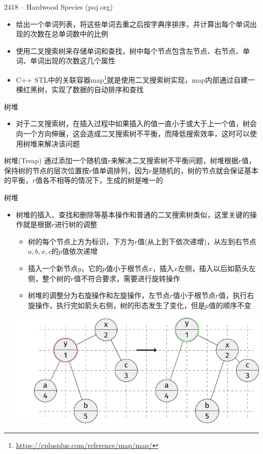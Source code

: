 \begin{frame}{2418 -- Hardwood Species (poj.org)}
    \begin{itemize}
        \item 给出一个单词列表，将这些单词去重之后按字典序排序，并计算出每个单词出现的次数在总单词数中的比例
        \vfill
        \item 使用二叉搜索树来存储单词和查找，树中每个节点包含左节点、右节点、单词、单词出现的次数这几个属性
        \vfill
        \item C++ STL中的关联容器map\footnote{\url{https://cplusplus.com/reference/map/map/}}就是使用二叉搜索树实现，map内部通过自建一棵红黑树，实现了数据的自动排序和查找
    \end{itemize}
\end{frame}
\begin{frame}{树堆}
    \begin{itemize}
        \item  对于二叉搜索树，在插入过程中如果插入的值一直小于或大于上一个值，树会向一个方向伸展，这会造成二叉搜索树不平衡，而降低搜索效率，这时可以使用树堆来解决该问题
    \end{itemize}
    \vfill
    \begin{block}{树堆(Treap)}
        \quad 通过添加一个随机值$r$来解决二叉搜索树不平衡问题，树堆根据$r$值，保持树的节点的层次位置按$r$值单调排列，因为$r$是随机的，树的节点就会保证基本的平衡，$r$值各不相等的情况下，生成的树是唯一的
    \end{block}
\end{frame}
\begin{frame}{树堆}
    \begin{itemize}
        \item 树堆的插入、查找和删除等基本操作和普通的二叉搜索树类似，这里关键的操作就是根据$r$进行树的调整
        \begin{itemize}
            \item 树的每个节点上方为标识，下方为$r$值(从上到下依次递增)，从左到右节点$a,b,x,c$的$p$值依次递增
            \item 插入一个新节点$y$，它的$p$值小于根节点$x$，插入$x$左侧，插入以后如箭头左侧，整个树的$r$值不符合要求，需要进行旋转操作
            \item 树堆的调整分为右旋操作和左旋操作，左节点$r$值小于根节点$r$值，执行右旋操作，执行完如箭头右侧，树的形态发生了变化，但是$p$值的顺序不变
        \end{itemize}
        \includegraphics[scale=.6,center]{fig/6-6.pdf}
    \end{itemize}
\end{frame}
